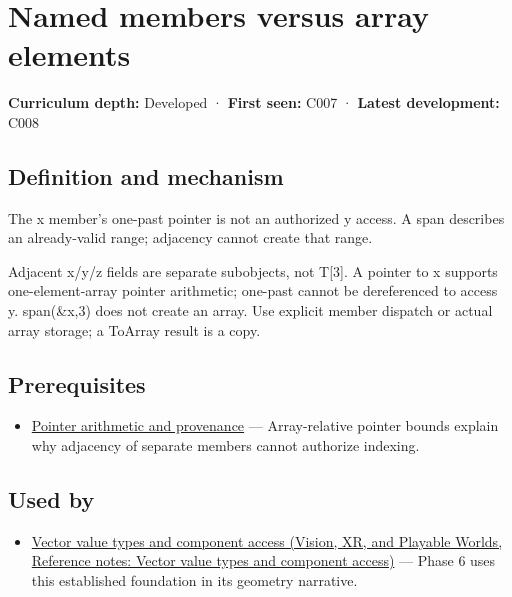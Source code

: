 \hypertarget{appendix-3f7e15effba6}{}\label{referencestart:appendix-3f7e15effba6}
\section{Named members versus array elements}\label{appendix-3f7e15effba6-named-members-versus-array-elements}

\textbf{Curriculum depth:} Developed · \textbf{First seen:} C007 · \textbf{Latest development:} C008

\begin{allmightroledefinition}

\subsection{Definition and mechanism}\label{appendix-3f7e15effba6-definition-and-mechanism}

The x member's one-past pointer is not an authorized y access. A span describes an already-valid range; adjacency cannot create that range.

\end{allmightroledefinition}

Adjacent x/y/z fields are separate subobjects, not T{[}3{]}. A pointer to x supports one-element-array pointer arithmetic; one-past cannot be dereferenced to access y. span(\&x,3) does not create an array. Use explicit member dispatch or actual array storage; a ToArray result is a copy.

\subsection{Prerequisites}\label{appendix-3f7e15effba6-prerequisites}

\begin{itemize}
\tightlist
\item
  \hyperref[appendix-6af5921bc853]{Pointer arithmetic and provenance} --- Array-relative pointer bounds explain why adjacency of separate members cannot authorize indexing.
\end{itemize}

\subsection{Used by}\label{appendix-3f7e15effba6-used-by}

\begin{itemize}
\tightlist
\item
  \href{../07-Vision-XR-and-Playable-Worlds/main.pdf\#nameddest=appendix-37a39984ba66}{Vector value types and component access (Vision, XR, and Playable Worlds, Reference notes: Vector value types and component access)} --- Phase 6 uses this established foundation in its geometry narrative.
\end{itemize}

